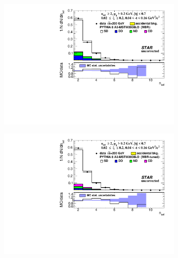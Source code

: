 \begin{figure}[H]
	\centering
	\begin{subfigure}{.45\textwidth}
		\includegraphics[width=\linewidth, page=1]{chapters/chrgSTAR/img/nonSD/chrg/SDT_pythia_xi0_RP_starsim_nsel.pdf}
	\end{subfigure}
	\begin{subfigure}{.45\textwidth}
		\includegraphics[width=\linewidth, page=1]{chapters/chrgSTAR/img/nonSD/chrg/SDT_pythia_xi0_option2_RP_starsim_nsel.pdf}
	\end{subfigure}
	\begin{subfigure}{.45\textwidth}

\end{subfigure}
\end{figure}
